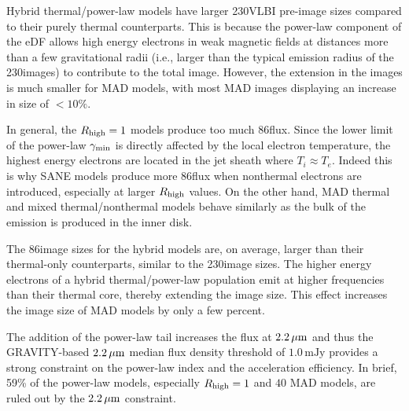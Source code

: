 
Hybrid thermal/power-law models have larger 230\GHz VLBI pre-image sizes compared to their purely thermal counterparts.
This is because the power-law component of the eDF allows high energy electrons in weak magnetic fields at distances more than a few gravitational radii (i.e., larger than the typical emission radius of the 230\GHz images) to contribute to the total image.
However, the extension in the images is much smaller for MAD models, with most MAD images displaying an increase in size of $<10\%$.


In general, the $R_{\rm high}=1$ models produce too much 86\GHz flux.
Since the lower limit of the power-law $\gamma_{\rm min}$ is directly affected by the local electron temperature, the highest energy electrons are located in the jet sheath where $T_i \approx T_e$.
Indeed this is why SANE models produce more 86\GHz flux when nonthermal electrons are introduced, especially at larger $R_\mathrm{high}$ values.
On the other hand, MAD thermal and mixed thermal/nonthermal models behave similarly as the bulk of the emission is produced in the inner disk.

The 86\GHz image sizes for the hybrid \hamr models are, on average, larger than their thermal-only counterparts, similar to the 230\GHz image sizes.
The higher energy electrons of a hybrid thermal/power-law population emit at higher frequencies than their thermal core, thereby extending the image size.
This effect increases the image size of MAD models by only a few percent.


The addition of the power-law tail increases the flux at $2.2\,\mu\mathrm{m}$ and thus the GRAVITY-based $2.2\,\mu\mathrm{m}$ median flux density threshold of $1.0\,\mathrm{mJy}$ provides a strong constraint on the power-law index and the acceleration efficiency.
In brief, 59\% of the power-law models, especially $R_\mathrm{high}=1$ and $40$ MAD models, are ruled out by the $2.2\,\mu\mathrm{m}$ constraint.


